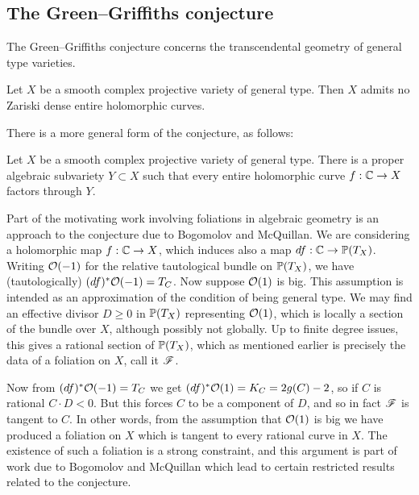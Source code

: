 

\subsection{The Green--Griffiths conjecture}

The Green--Griffiths conjecture concerns the transcendental geometry of general
type varieties.

\begin{conjecture}
    Let $X$ be a smooth complex projective variety of general type. Then $X$
    admits no Zariski dense entire holomorphic curves.
\end{conjecture}

There is a more general form of the conjecture, as follows:

\begin{conjecture}
    Let $X$ be a smooth complex projective variety of general type. There is a
    proper algebraic subvariety $Y\subset X$ such that every entire holomorphic
    curve $f:\C\to X$ factors through $Y$.
\end{conjecture}

Part of the motivating work involving foliations in algebraic geometry is an
approach to the conjecture due to Bogomolov and McQuillan. We are considering a
holomorphic map $f:\C\to X$, which induces also a map $df:\C\to\P(T_X)$. Writing
$\O(-1)$ for the relative tautological bundle on $\P(T_X)$, we have
(tautologically) $(df)^*\O(-1)=T_C$. Now suppose $\O(1)$ is big. This assumption
is intended as an approximation of the condition of being general type. We may
find an effective divisor $D\ge0$ in $\P(T_X)$ representing $\O(1)$, which is
locally a section of the bundle over $X$, although possibly not globally. Up to
finite degree issues, this gives a rational section of $\P(T_X)$, which as
mentioned earlier is precisely the data of a foliation on $X$, call it $\scrF$.

Now from $(df)^*\O(-1)=T_C$ we get $(df)^*\O(1)=K_C=2g(C)-2$, so if $C$ is
rational $C\cdot D<0$. But this forces $C$ to be a component of $D$, and so in
fact $\scrF$ is tangent to $C$. %
In other words, from the assumption that $\O(1)$ is big we have produced a
foliation on $X$ which is tangent to every rational curve in $X$. The existence
of such a foliation is a strong constraint, and this argument is part of work
due to Bogomolov and McQuillan \cite{mcquillan_98} which lead to certain
restricted results related to the conjecture.

